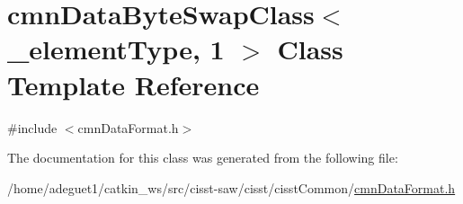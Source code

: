 \hypertarget{classcmn_data_byte_swap_class_3_01__element_type_00_011_01_4}{\section{cmn\-Data\-Byte\-Swap\-Class$<$ \-\_\-element\-Type, 1 $>$ Class Template Reference}
\label{classcmn_data_byte_swap_class_3_01__element_type_00_011_01_4}
}


{\ttfamily \#include $<$cmn\-Data\-Format.\-h$>$}



The documentation for this class was generated from the following file\-:\begin{DoxyCompactItemize}
\item 
/home/adeguet1/catkin\-\_\-ws/src/cisst-\/saw/cisst/cisst\-Common/\hyperlink{cmn_data_format_8h}{cmn\-Data\-Format.\-h}\end{DoxyCompactItemize}
